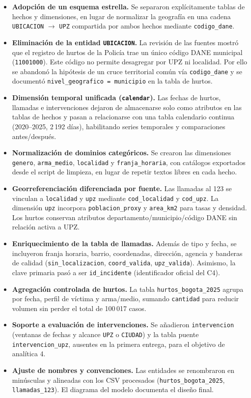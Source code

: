 \documentclass[12pt,letterpaper]{article}
\begin{document}
\begin{itemize}[noitemsep, topsep=0pt]
    \item \textbf{Adopción de un esquema estrella.} Se separaron explícitamente tablas de hechos y dimensiones, en lugar de normalizar la geografía en una cadena \texttt{UBICACION} $\rightarrow$ \texttt{UPZ} compartida por ambos hechos mediante \texttt{codigo\_dane}.
    \item \textbf{Eliminación de la entidad \texttt{UBICACION}.} La revisión de las fuentes mostró que el registro de hurtos de la Policía trae un único código DANE municipal (\texttt{11001000}). Este código no permite desagregar por UPZ ni localidad. Por ello se abandonó la hipótesis de un cruce territorial común vía \texttt{codigo\_dane} y se documentó \texttt{nivel\_geografico = municipio} en la tabla de hurtos.
    \item \textbf{Dimensión temporal unificada (\texttt{calendar}).} Las fechas de hurtos, llamadas e intervenciones dejaron de almacenarse solo como atributos en las tablas de hechos y pasan a relacionarse con una tabla calendario continua (2020--2025, 2\,192 días), habilitando series temporales y comparaciones antes/después.
    \item \textbf{Normalización de dominios categóricos.} Se crearon las dimensiones \texttt{genero}, \texttt{arma\_medio}, \texttt{localidad} y \texttt{franja\_horaria}, con catálogos exportados desde el script de limpieza, en lugar de repetir textos libres en cada hecho.
    \item \textbf{Georreferenciación diferenciada por fuente.} Las llamadas al 123 se vinculan a \texttt{localidad} y \texttt{upz} mediante \texttt{cod\_localidad} y \texttt{cod\_upz}. La dimensión \texttt{upz} incorpora \texttt{poblacion\_proxy} y \texttt{area\_km2} para tasas y densidad. Los hurtos conservan atributos departamento/municipio/código DANE sin relación activa a UPZ.
    \item \textbf{Enriquecimiento de la tabla de llamadas.} Además de tipo y fecha, se incluyeron franja horaria, barrio, coordenadas, dirección, agencia y banderas de calidad (\texttt{sin\_localizacion}, \texttt{coord\_valida}, \texttt{upz\_valida}). Asimismo, la clave primaria pasó a ser \texttt{id\_incidente} (identificador oficial del C4).
    \item \textbf{Agregación controlada de hurtos.} La tabla \texttt{hurtos\_bogota\_2025} agrupa por fecha, perfil de víctima y arma/medio, sumando \texttt{cantidad} para reducir volumen sin perder el total de 100\,017 casos.
    \item \textbf{Soporte a evaluación de intervenciones.} Se añadieron \texttt{intervencion} (ventanas de fechas y alcance \texttt{UPZ} o \texttt{CIUDAD}) y la tabla puente \texttt{intervencion\_upz}, ausentes en la primera entrega, para el objetivo de analítica 4.
    \item \textbf{Ajuste de nombres y convenciones.} Las entidades se renombraron en minúsculas y alineadas con los CSV procesados (\texttt{hurtos\_bogota\_2025}, \texttt{llamadas\_123}). El diagrama del modelo documenta el diseño final.
\end{itemize}
\end{document}
